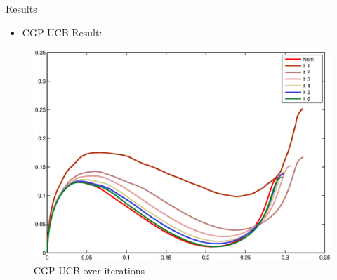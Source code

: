 \documentclass[handout]{beamer}
\begin{document}
\begin{frame}{Results}
\begin{itemize}
\item CGP-UCB Result: \pause
\end{itemize}
\begin{figure}
\center
\includegraphics[scale=0.40]{CGPUCBwind_yz}			
\caption{CGP-UCB over iterations}
\end{figure}
\end{frame}
%
%
\end{document}
